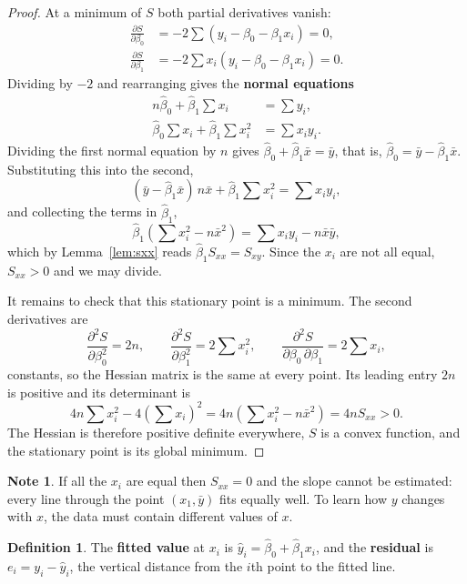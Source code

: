 \documentclass[11pt,a4paper]{article}
\numberwithin{equation}{section}
\theoremstyle{definition}
\newtheorem{defn}[thm]{Definition}
\newtheorem*{note}{Note}
\begin{document}
\begin{proof}
At a minimum of $S$ both partial derivatives vanish:
\begin{align*}
\frac{\partial S}{\partial \beta_0} &= -2 \sum \left( y_i - \beta_0 - \beta_1 x_i \right) = 0, \\
\frac{\partial S}{\partial \beta_1} &= -2 \sum x_i \left( y_i - \beta_0 - \beta_1 x_i \right) = 0 .
\end{align*}
Dividing by $-2$ and rearranging gives the \textbf{normal equations}
\begin{align*}
n\hat\beta_0 + \hat\beta_1 \sum x_i &= \sum y_i, \\
\hat\beta_0 \sum x_i + \hat\beta_1 \sum x_i^2 &= \sum x_i y_i .
\end{align*}
Dividing the first normal equation by $n$ gives $\hat\beta_0 + \hat\beta_1 \bar x = \bar y$,
that is, $\hat\beta_0 = \bar y - \hat\beta_1 \bar x$. Substituting this into the second,
\[
(\bar y - \hat\beta_1 \bar x)\, n\bar x + \hat\beta_1 \sum x_i^2 = \sum x_i y_i ,
\]
and collecting the terms in $\hat\beta_1$,
\[
\hat\beta_1 \left( \sum x_i^2 - n\bar x^2 \right) = \sum x_i y_i - n\bar x\bar y ,
\]
which by Lemma~\ref{lem:sxx} reads $\hat\beta_1 S_{xx} = S_{xy}$. Since the $x_i$ are not all
equal, $S_{xx} > 0$ and we may divide.

It remains to check that this stationary point is a minimum. The second derivatives are
\[
\frac{\partial^2 S}{\partial \beta_0^2} = 2n, \qquad
\frac{\partial^2 S}{\partial \beta_1^2} = 2\sum x_i^2, \qquad
\frac{\partial^2 S}{\partial \beta_0 \, \partial \beta_1} = 2\sum x_i ,
\]
constants, so the Hessian matrix is the same at every point. Its leading entry $2n$ is
positive and its determinant is
\[
4n\sum x_i^2 - 4\left(\sum x_i\right)^2 = 4n\left( \sum x_i^2 - n\bar x^2 \right) = 4nS_{xx} > 0 .
\]
The Hessian is therefore positive definite everywhere, $S$ is a convex function, and the
stationary point is its global minimum.
\end{proof}

\begin{note}
If all the $x_i$ are equal then $S_{xx} = 0$ and the slope cannot be estimated: every line
through the point $(x_1, \bar y)$ fits equally well. To learn how $y$ changes with $x$, the
data must contain different values of $x$.
\end{note}

\begin{defn}
The \textbf{fitted value} at $x_i$ is $\hat y_i = \hat\beta_0 + \hat\beta_1 x_i$, and the
\textbf{residual} is $e_i = y_i - \hat y_i$, the vertical distance from the $i$th point to
the fitted line.
\end{defn}
\end{document}
